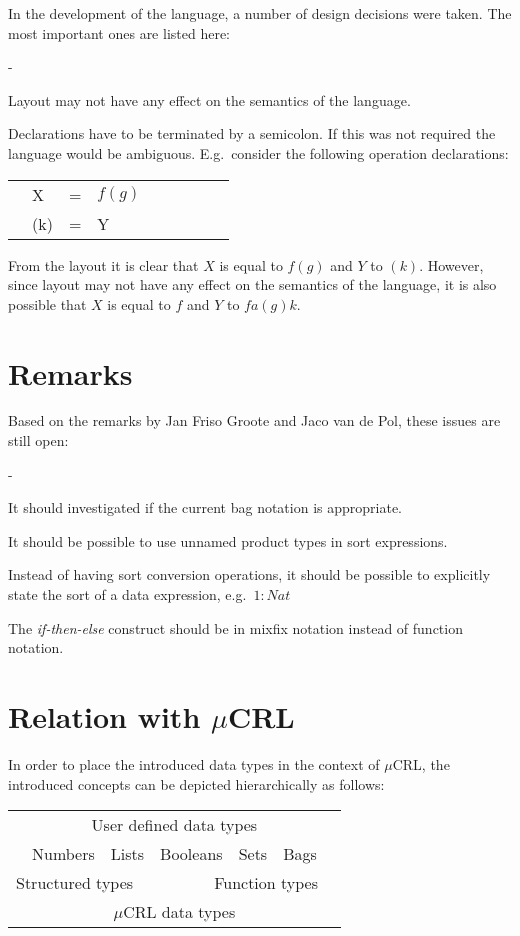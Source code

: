 \documentclass[a4paper,fleqn]{article}
\makeatletter
\newenvironment{tdefinitions}[2][0.15em]
  {\begin{list}%
    {#2}%
    {\setlength{\parsep}{0pt}%
     \setlength{\itemsep}{#1}%
     \setlength{\leftmargin}{\mathindent}%
     \setlength{\labelwidth}{\mathindent - \labelsep}%
    }
  }
  {\end{list}}
\newcommand{\frm}[1]{\mbox{\ensuremath{#1}}}
\newcommand{\f}[1]{\ensuremath{\mathit{#1}}}
\newcommand{\fa}[2]{\ensuremath{\f{#1}(#2)}}
\newcommand{\mCRL}{\frm{\mu}CRL\xspace}
\newlength{\tlength}
\newenvironment{genspect}%
{\par\bigskip\noindent%
 \begin{tabular}{@{}>{\bf}p{2.3em}L@{\ }L@{\ }L@{\ }L@{\ }L@{\ }L@{\ }L@{\ }L}%
}%
{\end{tabular}\bigskip\par%
}
\makeatother
\begin{document}
In the development of the language, a number of design decisions were taken.
The most important ones are listed here:
\begin{tdefinitions}{-}
\item Layout may not have any effect on the semantics of the language.
\item Declarations have to be terminated by a semicolon. If this was not
required the language would be ambiguous. E.g.\ consider the following
operation declarations:
\begin{genspect}
& X   & = & \fa{f}{g}\\
& (k) & = & Y\\
\end{genspect}
From the layout it is clear that \frm{X} is equal to \frm{\fa{f}{g}} and
\frm{Y} to \frm{(k)}. However, since layout may not have any effect on the
semantics of the language, it is also possible that \frm{X} is equal to
\frm{f} and \frm{Y} to \frm{fa{(g)}{k}}.
\end{tdefinitions}

\section{Remarks}

Based on the remarks by Jan Friso Groote and Jaco van de Pol, these issues are
still open:
\begin{tdefinitions}{-}
\item It should investigated if the current bag notation is appropriate.
\item It should be possible to use unnamed product types in sort expressions.
\item Instead of having sort conversion operations, it should be possible to
explicitly state the sort of a data expression, e.g.\ \frm{1: \f{Nat}}
\item The \emph{if-then-else} construct should be in mixfix notation instead of
function notation.
\end{tdefinitions}

\section{Relation with \mCRL}

In order to place the introduced data types in the context of \mCRL, the
introduced concepts can be depicted hierarchically as follows:

\begin{center}
\renewcommand{\arraystretch}{2.5}
\begin{tabular}{|p{2em}|c|c|c|c|c|c|p{2em}|}
\hline
\multicolumn{8}{|c|}{User defined data types}\\\cline{2-7}
& Numbers & Lists & \multicolumn{2}{c|}{Booleans} & Sets & Bags &\\\hline
\multicolumn{4}{|p{13em}|}{\centering Structured types}
  & \multicolumn{4}{c|}{Function types}\\\hline
\multicolumn{8}{|c|}{\mCRL data types}\\
\hline
\end{tabular}
\end{center}
\end{document}
